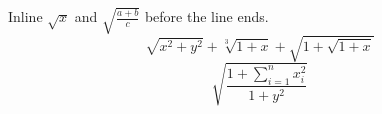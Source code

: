 \documentclass[12pt,letterpaper]{article}
\begin{document}
Inline $\sqrt{x}$ and $\sqrt{\frac{a+b}{c}}$ before the line ends.
\[
 \sqrt{x^2+y^2} + \sqrt[3]{1+x} + \sqrt{1+\sqrt{1+x}}
\]
\[
 \sqrt{\dfrac{1+\sum_{i=1}^{n}x_i^2}{1+y^2}}
\]
\end{document}
